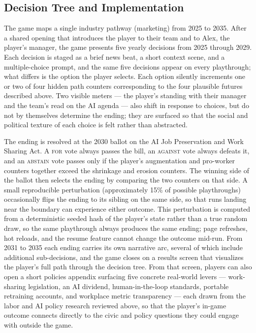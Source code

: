 \subsection{Decision Tree and Implementation}

The game maps a single industry pathway (marketing) from 2025 to 2035. After a shared opening that introduces the player to their team and to Alex, the player's manager, the game presents five yearly decisions from 2025 through 2029. Each decision is staged as a brief news beat, a short context scene, and a multiple-choice prompt, and the same five decisions appear on every playthrough; what differs is the option the player selects. Each option silently increments one or two of four hidden path counters corresponding to the four plausible futures described above. Two visible meters --- the player's standing with their manager and the team's read on the AI agenda --- also shift in response to choices, but do not by themselves determine the ending; they are surfaced so that the social and political texture of each choice is felt rather than abstracted.

The ending is resolved at the 2030 ballot on the AI Job Preservation and Work Sharing Act. A \textsc{for} vote always passes the bill, an \textsc{against} vote always defeats it, and an \textsc{abstain} vote passes only if the player's augmentation and pro-worker counters together exceed the shrinkage and erosion counters. The winning side of the ballot then selects the ending by comparing the two counters on that side. A small reproducible perturbation (approximately 15\% of possible playthroughs) occasionally flips the ending to its sibling on the same side, so that runs landing near the boundary can experience either outcome. This perturbation is computed from a deterministic seeded hash of the player's state rather than a true random draw, so the same playthrough always produces the same ending; page refreshes, hot reloads, and the resume feature cannot change the outcome mid-run. From 2031 to 2035 each ending carries its own narrative arc, several of which include additional sub-decisions, and the game closes on a results screen that visualizes the player's full path through the decision tree. From that screen, players can also open a short policies appendix surfacing five concrete real-world levers --- work-sharing legislation, an AI dividend, human-in-the-loop standards, portable retraining accounts, and workplace metric transparency --- each drawn from the labor and AI policy research reviewed above, so that the player's in-game outcome connects directly to the civic and policy questions they could engage with outside the game.

